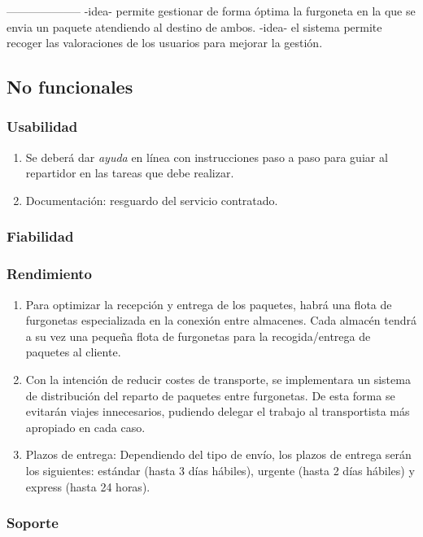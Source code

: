 --------------------
-idea- permite gestionar de forma óptima la furgoneta en la que se envia un paquete atendiendo al destino de ambos.
-idea- el sistema permite recoger las valoraciones de los usuarios para mejorar la gestión.

\subsection{No funcionales}
\subsubsection{Usabilidad}
\begin{enumerate}
	\item Se deberá dar \textit{ayuda} en línea con instrucciones paso a paso para guiar al repartidor en las tareas que debe realizar.
	\item Documentación: resguardo del servicio contratado.
	
\end{enumerate}
\subsubsection{Fiabilidad}

\subsubsection{Rendimiento}
\begin{enumerate}
	\item Para optimizar la recepción y entrega de los paquetes, habrá una flota de furgonetas especializada en la conexión entre almacenes. Cada almacén tendrá a su vez una pequeña flota de furgonetas para la recogida/entrega de paquetes al cliente.
	\item Con la intención de reducir costes de transporte, se implementara un sistema de distribución del reparto de paquetes entre furgonetas. De esta forma se evitarán viajes innecesarios, pudiendo delegar el trabajo al transportista más apropiado en cada caso.
	\item Plazos de entrega: Dependiendo del tipo de envío, los plazos de entrega serán los siguientes: estándar (hasta 3 días hábiles), urgente (hasta 2 días hábiles) y express (hasta 24 horas).
\end{enumerate}

\subsubsection{Soporte}


